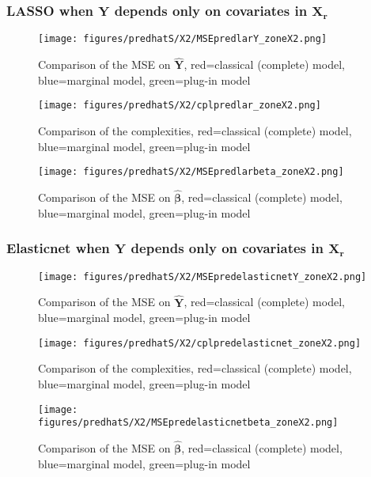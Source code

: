 \documentclass[12pt,a4paper]{report}
\begin{document}
\subsubsection{LASSO when $\boldsymbol{Y}$ depends only on covariates in $\boldsymbol{X_r}$}

	\begin{figure}[h!]
	\centering
		  \texttt{[image: figures/predhatS/X2/MSEpredlarY\_zoneX2.png]}
		\caption{Comparison of the MSE on $\hat{\boldsymbol{Y}}$, red=classical (complete) model, blue=marginal model, green=plug-in model}\label{MSEpredlarY_zoneX2}
	\end{figure}
	\begin{figure}[h!]
	\centering
		  \texttt{[image: figures/predhatS/X2/cplpredlar\_zoneX2.png]}
		\caption{Comparison of the complexities, red=classical (complete) model, blue=marginal model, green=plug-in model}\label{cplpredlar_zoneX2}
	\end{figure}
	\begin{figure}[h!]
	\centering
		  \texttt{[image: figures/predhatS/X2/MSEpredlarbeta\_zoneX2.png]}
		\caption{Comparison of the MSE on $\hat{\boldsymbol{\beta}}$, red=classical (complete) model, blue=marginal model, green=plug-in model}\label{MSEpredlarbeta_zoneX2}
	\end{figure}
	\FloatBarrier
\newpage
\subsubsection{Elasticnet when $\boldsymbol{Y}$ depends only on covariates in $\boldsymbol{X_r}$}

	\begin{figure}[h!]
	\centering
		  \texttt{[image: figures/predhatS/X2/MSEpredelasticnetY\_zoneX2.png]}
		\caption{Comparison of the MSE on $\hat{\boldsymbol{Y}}$, red=classical (complete) model, blue=marginal model, green=plug-in model}\label{MSEpredelasticnetY_zoneX2}
	\end{figure}
	\begin{figure}[h!]
	\centering
		  \texttt{[image: figures/predhatS/X2/cplpredelasticnet\_zoneX2.png]}
		\caption{Comparison of the complexities, red=classical (complete) model, blue=marginal model, green=plug-in model}\label{cplpredelasticnet_zoneX2}
	\end{figure}
	\begin{figure}[h!]
	\centering
		  \texttt{[image: figures/predhatS/X2/MSEpredelasticnetbeta\_zoneX2.png]}
		\caption{Comparison of the MSE on $\hat{\boldsymbol{\beta}}$, red=classical (complete) model, blue=marginal model, green=plug-in model}\label{MSEpredelasticnetbeta_zoneX2}
	\end{figure}
	\FloatBarrier
\newpage
\end{document}
